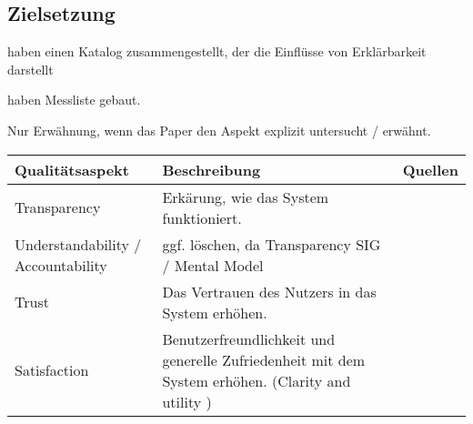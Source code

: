 \subsection{Zielsetzung}
\label{subsec:model_objective}

\cite{chazette_knowledge_nodate} haben einen Katalog zusammengestellt, der die Einflüsse von Erklärbarkeit darstellt

\cite{tintarev_designing_nodate} haben Messliste gebaut.

Nur Erwähnung, wenn das Paper den Aspekt explizit untersucht / erwähnt.

\begin{longtable}{|p{}|p{}|p{}|}
    \hline
    \textbf{Qualitätsaspekt}     & \textbf{Beschreibung} & \textbf{Quellen} \\ \hline
    Transparency      & Erkärung, wie das System funktioniert. & \cite{nunes_systematic_2017} \cite{chazette_knowledge_nodate} \cite{tintarev_designing_nodate} \cite{chazette_end-users_nodate} \cite{balog_measuring_2020} \cite{chazette2020explainability} \cite{tintarev2015explaining} \cite{hernandez-bocanegra_effects_2020} \cite{tsai_effects_2020} \cite{rjoob_towards_2021}  \cite{sokol_one_2020} \cite{wang_is_2018} \cite{koo_understanding_2016} \cite{tintarev2007survey}\\ \hline
    Understandability / Accountability & ggf. löschen, da Transparency SIG / Mental Model & \cite{chazette_knowledge_nodate} \cite{chazette_end-users_nodate} \cite{martin_evaluating_2021}  \cite{ehsan_human-centered_2020} \cite{rjoob_towards_2021}  \cite{sokol_one_2020} \cite{cheng2019explaining} \\ \hline
    Trust      & Das Vertrauen des Nutzers in das System erhöhen. & \cite{nunes_systematic_2017} \cite{chazette_knowledge_nodate} \cite{tintarev_designing_nodate} \cite{balog_measuring_2020} \cite{eiband_impact_2019} \cite{tintarev2015explaining} \cite{hernandez-bocanegra_effects_2020} \cite{stange_effects_2021} \cite{weitz_you_2019} \cite{yamada_evaluating_2016} \cite{haspiel_explanations_2018} \cite{martin_developing_2019} \cite{martin_evaluating_2021} \cite{tsai_effects_2020}  \cite{sokol_one_2020}  \cite{wang_is_2018} \cite{koo_understanding_2016} \cite{wiegand2019drive} \cite{gunning2019darpa} \cite{lim_2009_assessing} \cite{tintarev2007survey} \\ \hline
    Satisfaction      & Benutzerfreundlichkeit und generelle Zufriedenheit mit dem System erhöhen. (Clarity and utility \cite{martin_evaluating_2021}) & \cite{nunes_systematic_2017} \cite{chazette_knowledge_nodate} \cite{tintarev_designing_nodate} \cite{balog_measuring_2020} \cite{tsai_evaluating_2019} \cite{tintarev2015explaining} \cite{riveiro_thats_2021} \cite{martin_developing_2019} \cite{martin_evaluating_2021} \cite{tsai_effects_2020} \cite{ehsan_human-centered_2020} \cite{sovrano_modelling_2020} \cite{koo_understanding_2016} \cite{ribera2019can} \cite{gunning2019darpa} \cite{lim_2009_assessing}  \cite{tintarev2007survey}\\ \hline

\end{longtable}
